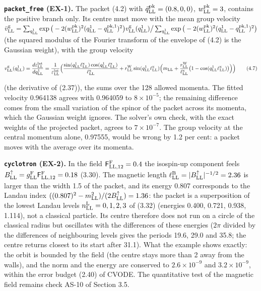 \documentclass[
  10pt,
]{article}
\begin{document}
\textbf{\texttt{packet\_free} (EX-1).} The packet (4.2) with
\(\vec q^{\rm pk}_{\rm LL}=(0.8,0,0)\), \(w^{\rm pk}_{\rm LL}=3\),
contains the positive branch only. Its centre must move with the mean
group velocity
\(\bar v^{\rm g}_{\rm LL}=\sum_{q^1_{\rm LL}}\exp\big(-2(w^{\rm pk}_{\rm LL})^2(q^1_{\rm LL}-q^{{\rm pk},1}_{\rm LL})^2\big)v^{\rm g}_{\rm LL}(q^1_{\rm LL})\big/\sum_{q^1_{\rm LL}}\exp\big(-2(w^{\rm pk}_{\rm LL})^2(q^1_{\rm LL}-q^{{\rm pk},1}_{\rm LL})^2\big)\)
(the squared modulus of the Fourier transform of the envelope of (4.2)
is the Gaussian weight), with the group velocity

\[v^{\rm g}_{\rm LL}(q^1_{\rm LL})=\frac{d\varepsilon^{\rm lat}_{\rm LL}}{dq^1_{\rm LL}}=\frac1{\varepsilon^{\rm lat}_{\rm LL}}\Big(\frac{\sin(q^1_{\rm LL}\ell^{\rm x}_{\rm LL})\cos(q^1_{\rm LL}\ell^{\rm x}_{\rm LL})}{\ell^{\rm x}_{\rm LL}}+r^{\rm W}_{\rm LL}\sin(q^1_{\rm LL}\ell^{\rm x}_{\rm LL})\Big(m_{\rm LL}+\frac{r^{\rm W}_{\rm LL}}{\ell^{\rm x}_{\rm LL}}\big(1-\cos(q^1_{\rm LL}\ell^{\rm x}_{\rm LL})\big)\Big)\Big)\tag{4.7}\]

(the derivative of (2.37)), the sums over the 128 allowed momenta. The
fitted velocity 0.964138 agrees with 0.964059 to \(8\times10^{-5}\); the
remaining difference comes from the small variation of the spinor of the
packet across its momenta, which the Gaussian weight ignores. The
solver's own check, with the exact weights of the projected packet,
agrees to \(7\times10^{-7}\). The group velocity at the central momentum
alone, 0.97555, would be wrong by 1.2 per cent: a packet moves with the
average over its momenta.

\textbf{\texttt{cyclotron} (EX-2).} In the field
\(\mathsf F^{\rm F}_{{\rm LL},12}=0.4\) the isospin-up component feels
\(B^\uparrow_{\rm LL}=g^{\rm F}_{\rm LL}\mathsf F^{\rm F}_{{\rm LL},12}=0.18\)
(3.30). The magnetic length
\(\ell^{\rm B}_{\rm LL}=\lvert B^\uparrow_{\rm LL}\rvert^{-1/2}=2.36\)
is larger than the width 1.5 of the packet, and its energy 0.807
corresponds to the Landau index
\(((0.807)^2-m_{\rm LL}^2)/(2B^\uparrow_{\rm LL})=1.36\): the packet is
a superposition of the lowest Landau levels
\(n^{\rm L}_{\rm LL}=0,1,2,3\) of (3.32) (energies 0.400, 0.721, 0.938,
1.114), not a classical particle. Its centre therefore does not run on a
circle of the classical radius but oscillates with the differences of
these energies (\(2\pi\) divided by the differences of neighbouring
levels gives the periods 19.6, 29.0 and 35.8; the centre returns closest
to its start after 31.1). What the example shows exactly: the orbit is
bounded by the field (the centre stays more than 2 away from the walls),
and the norm and the energy are conserved to \(2.6\times10^{-9}\) and
\(3.2\times10^{-9}\), within the error budget (2.40) of CVODE. The
quantitative test of the magnetic field remains check AS-10 of Section
3.5.
\end{document}
